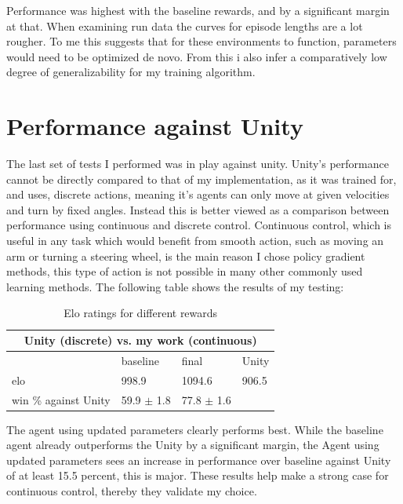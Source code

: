 \noindent
Performance was highest with the baseline rewards, and by a significant margin at that. When examining run data the curves for episode lengths are a lot rougher. To me this suggests that for these environments to function, parameters would need to be optimized de novo. From this i also infer a comparatively low degree of generalizability for my training algorithm.

\section{Performance against Unity}\label{sec:tr:performance}
The last set of tests I performed was in play against unity. Unity's performance cannot be directly compared to that of my implementation, as it was trained for, and uses, discrete actions, meaning it's agents can only move at given velocities and turn by fixed angles. Instead this is better viewed as a comparison between performance using continuous and discrete control. Continuous control, which is useful in any task which would benefit from smooth action, such as moving an arm or turning a steering wheel, is the main reason I chose policy gradient methods, this type of action is not possible in many other commonly used learning methods. 
The following table shows the results of my testing:

\begin{table}[H]
    \begin{center}
    \begin{tabular}{ |l|l|l|l| }
        \hline
        \multicolumn{4}{|c|}{Unity (discrete) vs. my work (continuous)}\\
        \hline
        \hline
         & baseline  & final & Unity \\
        \hline
        elo & 998.9 & 1094.6 & 906.5 \\ 
        win \% against Unity & 59.9 $\pm$ 1.8 & 77.8 $\pm$ 1.6 &  \\
        \hline
    \end{tabular}
    \end{center}
    \caption{Elo ratings for different rewards}
    \label{tab:my_label}
\end{table}

\noindent
The agent using updated parameters clearly performs best. While the baseline agent already outperforms the Unity by a significant margin, the Agent using updated parameters sees an increase in performance over baseline against Unity of at least 15.5 percent, this is major. These results help make a strong case for continuous control, thereby they validate my choice.

